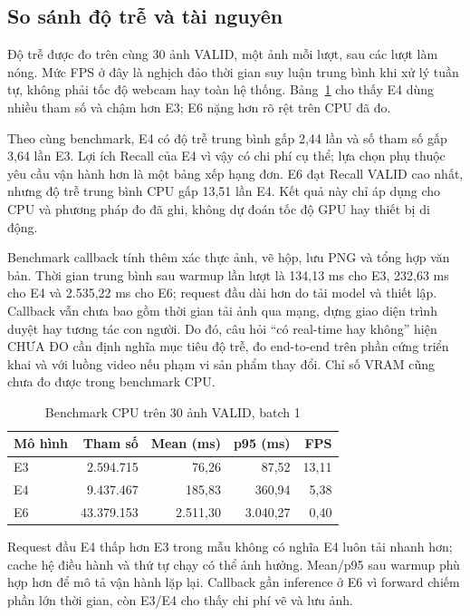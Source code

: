 \documentclass[12pt,a4paper,oneside]{report}
\begin{document}
\subsection{So sánh độ trễ và tài nguyên}
Độ trễ được đo trên cùng 30 ảnh VALID, một ảnh mỗi lượt, sau các lượt làm nóng. Mức FPS ở đây là nghịch đảo thời gian suy luận trung bình khi xử lý tuần tự, không phải tốc độ webcam hay toàn hệ thống.  Bảng~\ref{tab:benchfull} cho thấy E4 dùng nhiều tham số và chậm hơn E3; E6 nặng hơn rõ rệt trên CPU đã đo.



Theo cùng benchmark, E4 có độ trễ trung bình gấp 2,44 lần và số tham số gấp 3,64 lần E3.  Lợi ích Recall của E4 vì vậy có chi phí cụ thể; lựa chọn phụ thuộc yêu cầu vận hành hơn là một bảng xếp hạng đơn. E6 đạt Recall VALID cao nhất, nhưng độ trễ trung bình CPU gấp 13,51 lần E4.  Kết quả này chỉ áp dụng cho CPU và phương pháp đo đã ghi, không dự đoán tốc độ GPU hay thiết bị di động.

Benchmark callback tính thêm xác thực ảnh, vẽ hộp, lưu PNG và tổng hợp văn bản. Thời gian trung bình sau warmup lần lượt là 134,13 ms cho E3, 232,63 ms cho E4 và 2.535,22 ms cho E6; request đầu dài hơn do tải model và thiết lập.  Callback vẫn chưa bao gồm thời gian tải ảnh qua mạng, dựng giao diện trình duyệt hay tương tác con người. Do đó, câu hỏi ``có real-time hay không'' hiện CHƯA ĐO cần định nghĩa mục tiêu độ trễ, đo end-to-end trên phần cứng triển khai và với luồng video nếu phạm vi sản phẩm thay đổi. Chỉ số VRAM cũng chưa đo được trong benchmark CPU. 



\begin{table}[H]\centering\small
\caption{Benchmark CPU trên 30 ảnh VALID, batch 1}\label{tab:benchfull}
\begin{tabular}{lrrrr}\toprule
Mô hình & Tham số & Mean (ms) & p95 (ms) & FPS\\\midrule
E3 & 2.594.715 & 76,26 & 87,52 & 13,11\\
E4 & 9.437.467 & 185,83 & 360,94 & 5,38\\
E6 & 43.379.153 & 2.511,30 & 3.040,27 & 0,40\\
\bottomrule\end{tabular}\end{table}


Request đầu E4 thấp hơn E3 trong mẫu không có nghĩa E4 luôn tải nhanh hơn; cache hệ điều hành và thứ tự chạy có thể ảnh hưởng. Mean/p95 sau warmup phù hợp hơn để mô tả vận hành lặp lại. Callback gần inference ở E6 vì forward chiếm phần lớn thời gian, còn E3/E4 cho thấy chi phí vẽ và lưu ảnh.
\end{document}
